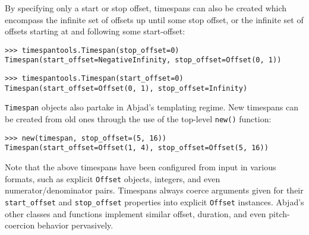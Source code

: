 \noindent By specifying only a start or stop offset, timespans can also be
created which encompass the infinite set of offsets up until some stop offset,
or the infinite set of offsets starting at and following some start-offset:

\begin{comment}
<abjad>
timespantools.Timespan(stop_offset=0)
timespantools.Timespan(start_offset=0)
</abjad>
\end{comment}

\begin{abjadbookoutput}
\begin{singlespacing}
\vspace{-0.5\baselineskip}
\begin{lstlisting}
>>> timespantools.Timespan(stop_offset=0)
Timespan(start_offset=NegativeInfinity, stop_offset=Offset(0, 1))
\end{lstlisting}
\begin{lstlisting}
>>> timespantools.Timespan(start_offset=0)
Timespan(start_offset=Offset(0, 1), stop_offset=Infinity)
\end{lstlisting}
\end{singlespacing}
\end{abjadbookoutput}

\noindent \texttt{Timespan} objects also partake in Abjad's templating regime.
New timespans can be created from old ones through the use of the top-level
\texttt{new()} function:

\begin{comment}
<abjad>
new(timespan, stop_offset=(5, 16))
</abjad>
\end{comment}

\begin{abjadbookoutput}
\begin{singlespacing}
\vspace{-0.5\baselineskip}
\begin{lstlisting}
>>> new(timespan, stop_offset=(5, 16))
Timespan(start_offset=Offset(1, 4), stop_offset=Offset(5, 16))
\end{lstlisting}
\end{singlespacing}
\end{abjadbookoutput}

\noindent Note that the above timespans have been configured from input in
various formats, such as explicit \texttt{Offset} objects, integers, and even
numerator/denominator pairs. Timespans always coerce arguments given for their
\texttt{start\_offset} and \texttt{stop\_offset} properties into explicit
\texttt{Offset} instances. Abjad's other classes and functions implement
similar offset, duration, and even pitch-coercion behavior pervasively.

